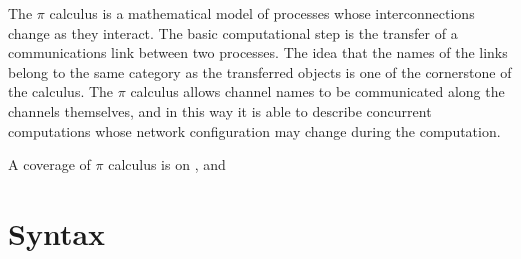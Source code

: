 


The $\pi$ calculus is a mathematical model of processes whose interconnections change as they interact. The basic computational step is the transfer of a communications link between two processes. The idea that the names of the links belong to the same category as the transferred objects is one of the cornerstone of the calculus. The $\pi$ calculus allows channel names to be communicated along the channels themselves, and in this way it is able to describe concurrent computations whose network configuration may change during the computation.

A coverage of $\pi$ calculus is on \cite{parrow}, \cite{sangiorgiwalker} and \cite{milner}

\section{Syntax}

